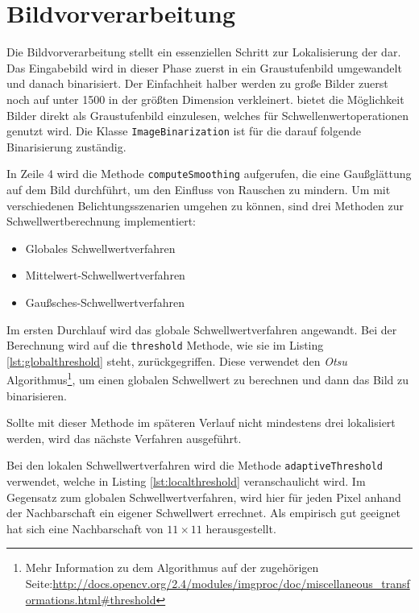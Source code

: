 \chapter{Bildvorverarbeitung}
Die Bildvorverarbeitung stellt ein essenziellen Schritt zur Lokalisierung der \QRCodes dar. Das Eingabebild wird in dieser Phase zuerst in ein Graustufenbild umgewandelt und danach binarisiert. Der Einfachheit halber werden zu große Bilder zuerst noch auf unter 1500 in der größten Dimension verkleinert. \OpenCV bietet die Möglichkeit Bilder direkt als Graustufenbild einzulesen, welches für Schwellenwertoperationen genutzt wird.
Die Klasse \texttt{ImageBinarization} ist für die darauf folgende Binarisierung zuständig. 

In Zeile 4 wird die Methode \texttt{computeSmoothing} aufgerufen, die eine Gaußglättung auf dem Bild durchführt, um den Einfluss von Rauschen zu mindern. Um mit verschiedenen Belichtungsszenarien umgehen zu können, sind drei Methoden zur Schwellwertberechnung implementiert:
\begin{itemize}
	\item Globales Schwellwertverfahren
	\item Mittelwert-Schwellwertverfahren
	\item Gaußsches-Schwellwertverfahren
\end{itemize}
Im ersten Durchlauf wird das globale Schwellwertverfahren angewandt. Bei der Berechnung wird auf die \texttt{threshold} Methode, wie sie im Listing \ref{lst:globalthreshold} steht, zurückgegriffen. Diese verwendet den \emph{Otsu} Algorithmus\footnote{Mehr Information zu dem Algorithmus auf der zugehörigen \OpenCV Seite:\url{http://docs.opencv.org/2.4/modules/imgproc/doc/miscellaneous_transformations.html\#threshold}}, um einen globalen Schwellwert zu berechnen und dann das Bild zu binarisieren.

Sollte mit dieser Methode im späteren Verlauf nicht mindestens drei \fps lokalisiert werden, wird das nächste Verfahren ausgeführt.


Bei den lokalen Schwellwertverfahren wird die Methode \texttt{adaptiveThreshold} verwendet, welche in Listing \ref{lst:localthreshold} veranschaulicht wird. Im Gegensatz zum globalen Schwellwertverfahren, wird hier für jeden Pixel anhand der Nachbarschaft ein eigener Schwellwert errechnet. Als empirisch gut geeignet hat sich eine Nachbarschaft von $11 \times 11$ herausgestellt.

